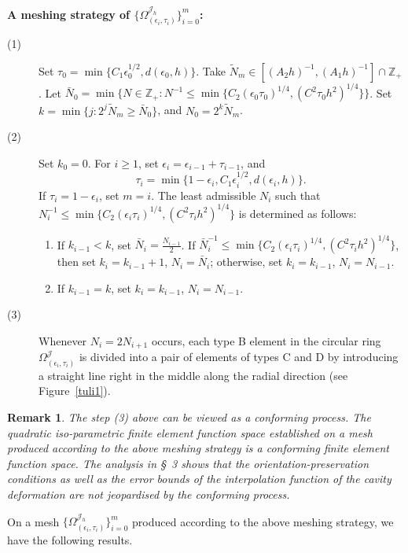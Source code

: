 \documentclass[12pt]{article}
\newtheorem{remark}[theorem]{Remark}
\numberwithin{equation}{section}
\begin{document}
\vskip 3mm
{\bf A meshing strategy of $\{\Omega^{\mathcal{J}_h}_{(\epsilon_i,\tau_i)}\}_{i=0}^{m}$:}
\begin{description}
\item[(1)]
Set $\tau_0=\min \{C_1\epsilon_0^{1/2},d(\epsilon_0,h)\}$.
Take $\tilde{N}_m \in [(A_2h)^{-1}, (A_1h)^{-1}] \cap \mathbb{Z}_+ $.
Let $\bar{N}_0= \min \{ N \in \mathbb{Z}_+: N^{-1}\le
\min\{ C_2(\epsilon_0\tau_0)^{1/4},(C^2\tau_0h^2)^{1/4}\} \}$.
Set $k=\min \{ j: 2^j
\tilde{N}_m \ge \bar{N}_0 \}$, and $N_0={2^k}\tilde{N}_m$.
\item[(2)] Set $k_0=0$. For $i \ge 1$, set $\epsilon_i=\epsilon_{i-1}+\tau_{i-1}$, and
\begin{equation}\label{tau}
\tau_i=\min\{1-\epsilon_i,C_1\epsilon_i^{1/2},d(\epsilon_i,h)\}.
\end{equation}
If $\tau_i=1-\epsilon_i$, set $m=i$. The least admissible
$N_i$ such that $N_i^{-1}\le \min\{ C_2(\epsilon_i\tau_i)^{1/4},(C^2\tau_ih^2)^{1/4}\}$
is determined as follows:
\begin{enumerate}
\item If $k_{i-1}<k$, set $\bar{N}_i=\frac{N_{i-1}}{2}$. If
$\bar{N}_i^{-1}\le \min\{ C_2(\epsilon_i\tau_i)^{1/4},(C^2\tau_ih^2)^{1/4}\}$,
then set $k_i=k_{i-1}+1$, $N_i=\bar{N}_i$; otherwise, set $k_i=k_{i-1}$,
$N_i=N_{i-1}$.
\item If $k_{i-1}=k$, set $k_i=k_{i-1}$, $N_i=N_{i-1}$.
\end{enumerate}
\item[(3)] Whenever $N_i=2N_{i+1}$ occurs, each type B element in the circular ring
$\Omega^\mathcal{J}_{(\epsilon_i,\tau_i)}$ is divided into a pair of elements of
types C and D by introducing a straight line right in the middle along the radial
direction (see Figure~\ref{tuli1}).
\end{description}

\begin{remark}
The step (3) above can be viewed as a conforming process.
The quadratic iso-parametric finite element function space established on a mesh produced
according to the above meshing strategy is a conforming finite element function space.
The analysis in \S~3 shows that the orientation-preservation conditions as well as
the error bounds of the interpolation function of the
cavity deformation are not jeopardised by the conforming process.
\end{remark}


On a mesh $\{\Omega^{\mathcal{J}_h}_{(\epsilon_i,\tau_i)}\}_{i=0}^{m}$ produced according
to the above meshing strategy, we have the following results.
\end{document}
